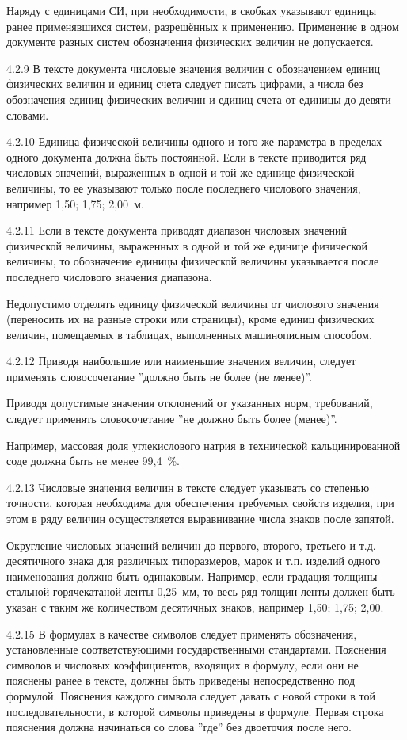 Наряду с единицами СИ, при необходимости, в скобках указывают единицы ранее применявшихся систем, разрешённых к применению. Применение в одном документе разных систем обозначения физических величин не допускается.

4.2.9 В тексте документа числовые значения величин с обозначением единиц физических величин и единиц счета следует писать цифрами, а числа без обозначения единиц физических величин и единиц счета от единицы до девяти – словами.

4.2.10 Единица физической величины одного и того же параметра в пределах одного документа должна быть постоянной. Если в тексте приводится ряд числовых значений, выраженных в одной и той же единице физической величины, то ее указывают только после последнего числового значения, например 1,50; 1,75; 2,00~м.

4.2.11 Если в тексте документа приводят диапазон числовых значений физической величины, выраженных в одной и той же единице физической величины, то обозначение единицы физической величины указывается после последнего числового значения диапазона.

Недопустимо отделять единицу физической величины от числового значения (переносить их на разные строки или страницы), кроме единиц физических величин, помещаемых в таблицах, выполненных машинописным способом.

4.2.12 Приводя наибольшие или наименьшие значения величин, следует применять словосочетание ''должно быть не более (не менее)''.

Приводя допустимые значения отклонений от указанных норм, требований, следует применять словосочетание ''не должно быть более (менее)''.

Например, массовая доля углекислового натрия в технической кальцинированной соде должна быть не менее 99,4~\%.

4.2.13 Числовые значения величин в тексте следует указывать со степенью точности, которая необходима для обеспечения требуемых свойств изделия, при этом в ряду величин осуществляется выравнивание числа знаков после запятой.

Округление числовых значений величин до первого, второго, третьего и т.д. десятичного знака для различных типоразмеров, марок и т.п. изделий одного наименования должно быть одинаковым. Например, если градация толщины стальной горячекатаной ленты 0,25~мм, то весь ряд толщин ленты должен быть указан с таким же количеством десятичных знаков, например 1,50; 1,75; 2,00.

4.2.15 В формулах в качестве символов следует применять обозначения, установленные соответствующими государственными стандартами. Пояснения символов и числовых коэффициентов, входящих в формулу, если они не пояснены ранее в тексте, должны быть приведены непосредственно под формулой. Пояснения каждого символа следует давать с новой строки в той последовательности, в которой символы приведены в формуле.
Первая строка пояснения должна начинаться со слова ''где'' без двоеточия после него.

